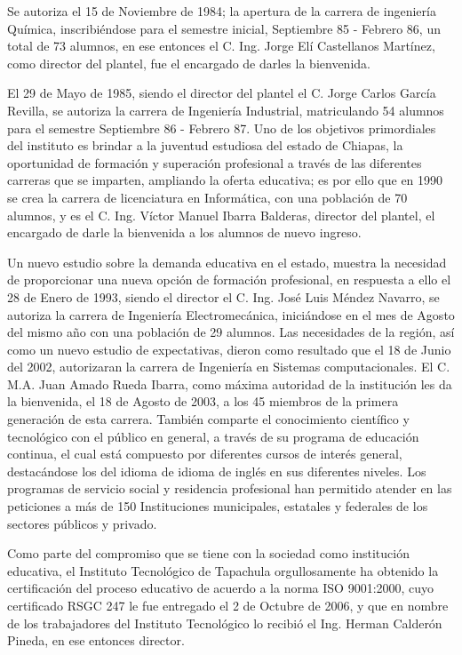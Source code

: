 Se autoriza el 15 de Noviembre de 1984; la apertura de la carrera de ingeniería Química, inscribiéndose para el semestre inicial, Septiembre 85 - Febrero 86, un total de 73 alumnos, en ese entonces el C. Ing. Jorge Elí Castellanos Martínez, como director del plantel, fue el encargado de darles la bienvenida.

El 29 de Mayo de 1985, siendo el director del plantel el C. Jorge Carlos García Revilla, se autoriza la carrera de Ingeniería Industrial, matriculando 54 alumnos para el semestre Septiembre 86 - Febrero 87. Uno de los objetivos primordiales del instituto es brindar a la juventud estudiosa del estado de Chiapas, la oportunidad de formación y superación profesional a través de las diferentes carreras que se imparten, ampliando la oferta educativa; es por ello que en 1990 se crea la carrera de licenciatura en Informática, con una población de 70 alumnos, y es el C. Ing. Víctor Manuel Ibarra Balderas, director del plantel, el encargado de darle la bienvenida a los alumnos de nuevo ingreso.

Un nuevo estudio sobre la demanda educativa en el estado, muestra la necesidad de proporcionar una nueva opción de formación profesional, en respuesta a ello el 28 de Enero de 1993, siendo el director el C. Ing. José Luis Méndez Navarro, se autoriza la carrera de Ingeniería Electromecánica, iniciándose en el mes de Agosto del mismo año con una población de 29 alumnos. Las necesidades de la región, así como un nuevo estudio de expectativas, dieron como resultado que el 18 de Junio del 2002, autorizaran la carrera de Ingeniería en Sistemas computacionales. El C. M.A. Juan Amado Rueda Ibarra, como máxima autoridad de la institución les da la bienvenida, el 18 de Agosto de 2003, a los 45 miembros de la primera generación de esta carrera. También comparte el conocimiento científico y tecnológico con el público en general, a través de su programa de educación continua, el cual está compuesto por diferentes cursos de interés general, destacándose los del idioma de idioma de inglés en sus diferentes niveles. Los programas de servicio social y residencia profesional han permitido atender en las peticiones a más de 150 Instituciones municipales, estatales y federales de los sectores públicos y privado.

Como parte del compromiso que se tiene con la sociedad como institución educativa, el Instituto Tecnológico de Tapachula orgullosamente ha obtenido la certificación del proceso educativo de acuerdo a la norma ISO 9001:2000, cuyo certificado RSGC 247 le fue entregado el 2 de Octubre de 2006, y que en nombre de los trabajadores del Instituto Tecnológico lo recibió el Ing. Herman Calderón Pineda, en ese entonces director.

